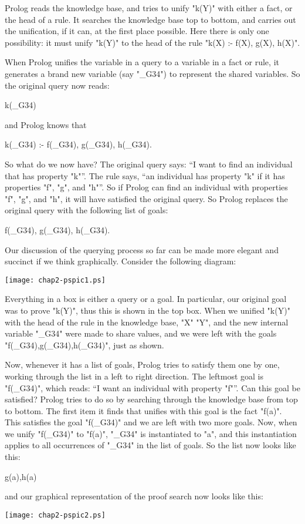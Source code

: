 Prolog reads the knowledge base, and tries to unify "k(Y)" with either
a fact, or the head of a rule. It searches the knowledge base top to
bottom, and carries out the unification, if it can, at the first place
possible. Here there is only one possibility: it must unify "k(Y)" to
the head of the rule "k(X) :- f(X), g(X), h(X)".

When Prolog unifies the variable in a query to a variable in a fact or
rule, it generates a brand new variable
(say "\_G34")
to represent the shared
variables. So the original query now reads:
\begin{LPNcodedisplay}
k(_G34)
\end{LPNcodedisplay}
%
and Prolog knows that
\begin{LPNcodedisplay}
k(_G34) :- f(_G34), g(_G34), h(_G34).
\end{LPNcodedisplay}


So what do we now have? The original query says: ``I want to find an
individual that has property "k"''. The rule says, ``an individual has
property "k" if it has properties "f", "g", and "h"''. So if Prolog
can find an individual with properties "f", "g", and "h", it will have
satisfied the original query. So Prolog replaces the original query
with the following list of goals:
\begin{LPNcodedisplay}
f(_G34), g(_G34), h(_G34).
\end{LPNcodedisplay}

Our discussion of the querying process so far can be made more elegant
and succinct if we think graphically. Consider the following diagram:
%
\begin{center}
\texttt{[image: chap2-pspic1.ps]}
\end{center}
%
Everything in a box is either a query or a goal.  In particular, our
original goal was to prove "k(Y)", thus this is shown in the top box.
When we unified "k(Y)" with the head of the rule in the knowledge
base, "X" "Y", and the new internal variable "\_G34" were made to share
values, and we were left with the goals "f(\_G34),g(\_G34),h(\_G34)",
just as shown.

Now, whenever it has a list of goals, Prolog tries to satisfy them one
by one, working through the list in a left to right direction. The
leftmost goal is "f(\_G34)", which reads: ``I want an individual with
property "f"''. Can this goal be satisfied? Prolog tries to do so by
searching through the knowledge base from top to bottom.  The first
item it finds that unifies with this goal is the fact "f(a)". This
satisfies the goal "f(\_G34)" and we are left with two more goals.
Now, when we unify "f(\_G34)" to "f(a)", "\_G34" is instantiated to "a",
and this instantiation applies to all occurrences of "\_G34" in the
list of goals. So the list now looks like this:
\begin{LPNcodedisplay}
g(a),h(a)
\end{LPNcodedisplay}
%
and our graphical representation of the proof search now looks like this:
%
\begin{center}
\texttt{[image: chap2-pspic2.ps]}
\end{center}
%

